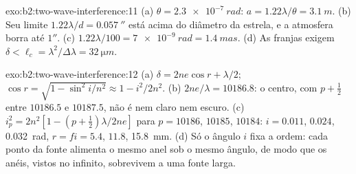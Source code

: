 \begin{solution}{exo:b2:two-wave-interference:11}
(a) $\theta = \qty{2.3e-7}{rad}$: $a = 1.22\lambda/\theta = \qty{3.1}{m}$. (b) Seu limite $1.22\lambda/d =
\qty{0.057}{''}$ está acima do diâmetro da estrela, e a atmosfera borra
até $1''$. (c) $1.22\lambda/100 = \qty{7e-9}{rad} = \qty{1.4}{mas}$. (d) As franjas exigem
$\delta < \ell_c = \lambda^2/\Delta\lambda = \qty{32}{\micro m}$.
\end{solution}

\begin{solution}{exo:b2:two-wave-interference:12}
(a) $\delta = 2ne\cos r + \lambda/2$; $\cos r = \sqrt{1 - \sin^2i/n^2} \approx 1 - i^2/2n^2$.
(b) $2ne/\lambda = 10186.8$: o centro, com $p + \tfrac12$ entre $10186.5$ e
$10187.5$, não é nem claro nem escuro. (c) $i_p^2 = 2n^2[1 - (p + \tfrac12)\lambda/
2ne]$ para $p = 10186$, $10185$, $10184$: $i = 0.011$, $0.024$, \qty{0.032}{rad}, $r = fi
= 5.4$, $11.8$, \qty{15.8}{mm}. (d) Só o ângulo $i$ fixa a ordem: cada
ponto da fonte alimenta o mesmo anel sob o mesmo ângulo, de modo que os anéis, vistos
no infinito, sobrevivem a uma fonte larga.
\end{solution}

